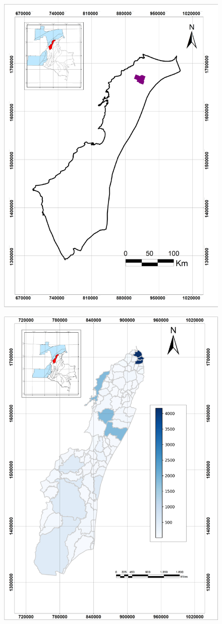 \documentclass{ifacconf}
\begin{document}
\begin{figure}
	\centering
	\includegraphics[width=0.7\linewidth]{"img/Mapa cubo sismico"}
	\caption[mapa3dsismica]{}
	\label{fig:mapa-cubo-sismico}
\end{figure}
\begin{figure}
	\centering
	\includegraphics[width=0.7\linewidth]{"img/mapa de emiciones"}
	\caption[mapaemisiones]{}
	\label{fig:mapa-de-emiciones}
\end{figure}
\end{document}
